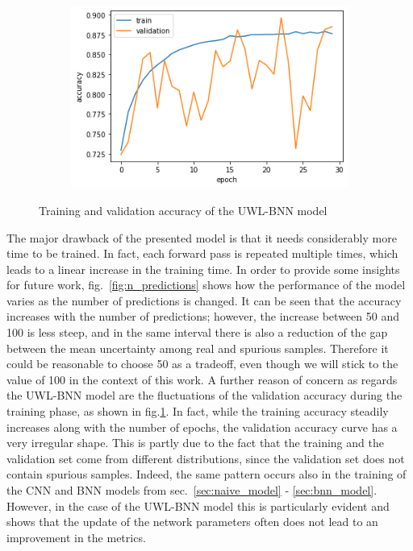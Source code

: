 \documentclass[11pt,twoside,a4paper]{article}
\begin{document}
\begin{figure}[!b]
    \centering
    \begin{subfigure}{0.49\textwidth}
	\includegraphics[width=\linewidth]{images/train_history.png}
    \end{subfigure}
    \caption{Training and validation accuracy of the UWL-BNN model}
    \label{fig:train_history}
\end{figure}

The major drawback of the presented model is that it needs considerably more time to be trained. In fact, each forward pass is repeated multiple times, which leads to a linear increase in the training time. In order to provide some insights for future work, fig.~\ref{fig:n_predictions} shows how the performance of the model varies as the number of predictions is changed. It can be seen that the accuracy increases with the number of predictions; however, the increase between 50 and 100 is less steep, and in the same interval there is also a reduction of the gap between the mean uncertainty among real and spurious samples. Therefore it could be reasonable to choose 50 as a tradeoff, even though we will stick to the value of 100 in the context of this work.\newline
A further reason of concern as regards the UWL-BNN model are the fluctuations of the validation accuracy during the training phase, as shown in fig.\ref{fig:train_history}. In fact, while the training accuracy steadily increases along with the number of epochs, the validation accuracy curve has a very irregular shape. This is partly due to the fact that the training and the validation set come from different distributions, since the validation set does not contain spurious samples. Indeed, the same pattern occurs also in the training of the CNN and BNN models from sec.~\ref{sec:naive_model} - \ref{sec:bnn_model}. However, in the case of the UWL-BNN model this is particularly evident and shows that the update of the network parameters often does not lead to an improvement in the metrics.\newline
\end{document}
